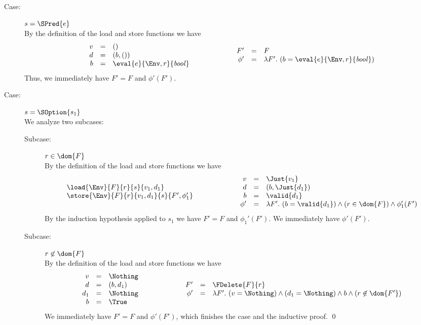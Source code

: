 {\begin{description}
\item[Case:] $s = \SPred{e}$\\[1ex]
%
By the definition of the load and store functions we have
\[
\begin{array}{rcl}
v &=& ()\\
d &=& (b,())\\
b &=& \eval{e}{\Env,r}{\mathit{bool}}\\
\end{array}\hspace*{2cm}\begin{array}{rcl}
F' &=& F\\
\phi' &=& \lambda F'.~(b = \eval{e}{\Env,r}{\mathit{bool}})\\
\end{array}
\]
Thus, we immediately have $F' = F$ and $\phi'(F')$.

\item[Case:] $s = \SOption{s_1}$\\[1ex]
%
We analyze two subcases:
\begin{description}
\item[Subcase:] $r \in \dom{F}$\\[1ex]
%
By the definition of the load and store functions we have
\[ 
\begin{array}{l}
\load{\Env}{F}{r}{s}{v_1,d_1}\\
\store{\Env}{F}{r}{v_1,d_1}{s}{ F',\phi_1' }\\
\end{array}\hspace*{2cm}\begin{array}{rcl}
v &=& \Just{v_1}\\
d &=& (b,\Just{d_1})\\
b &=& \valid{d_1}\\
\phi' &=& \lambda F'.~(b = \valid{d_1}) \wedge (r \in \dom{F}) \wedge \phi_1'(F')\\
\end{array}
\]
%
By the induction hypothesis applied to $s_1$ we have $F' = F$ and
$\phi_1'(F')$. We immediately have $\phi'(F')$.

\item[Subcase:] $r \not\in \dom{F}$\\[1ex]
%
By the definition of the load and store functions we have 
\[ 
\begin{array}{rcl}
v &=& \Nothing\\
d &=& (b,d_1)\\
d_1 &=& \Nothing\\
b &=& \True\\
\end{array}\hspace*{2cm}\begin{array}{rcl}
F' &=& \FDelete{F}{r}\\
\phi' &=& \lambda F'.~(v = \Nothing) \wedge (d_1 = \Nothing) \wedge b \wedge  (r \not\in \dom{F'})
\end{array}
\]
We immediately have $F' = F$ and $\phi'(F')$, which finishes the case
and the inductive proof. \hfill \qed
\end{description}
\end{description}
}


